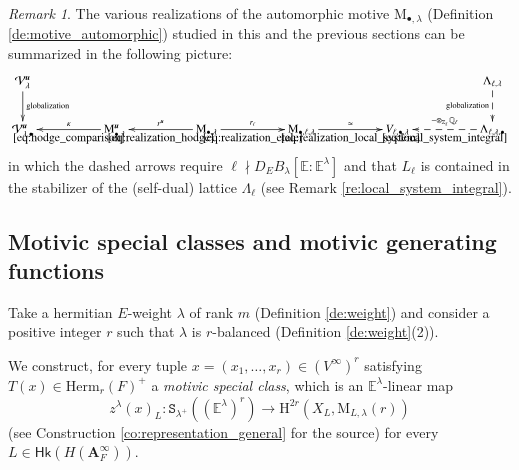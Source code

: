 \documentclass[12pt]{amsart}
\numberwithin{equation}{section}
\theoremstyle{plain}
\theoremstyle{definition}
\theoremstyle{remark}
\newtheorem{remark}[proposition]{Remark}
\renewcommand{\b}[1]{\mathbf{#1}}
\renewcommand{\c}[1]{\mathcal{#1}}
\renewcommand{\d}[1]{\mathbb{#1}}
\renewcommand{\r}[1]{\mathrm{#1}}
\renewcommand{\sf}[1]{\mathsf{#1}}
\renewcommand{\(}{\left(}
\renewcommand{\)}{\right)}
\newcommand{\bA}{\b A}
\newcommand{\cV}{\c V}
\newcommand{\dE}{\d E}
\newcommand{\dQ}{\d Q}
\newcommand{\dZ}{\d Z}
\newcommand{\rH}{\r H}
\newcommand{\rM}{\r M}
\newcommand{\tS}{\mathtt{S}}
\newcommand{\bbu}{\boldsymbol{u}}
\newcommand{\Herm}{\r{Herm}}
\newcommand{\Hk}{\sf{Hk}}
\begin{document}
\begin{remark}
The various realizations of the automorphic motive $\rM_{\bullet,\lambda}$ (Definition \ref{de:motive_automorphic}) studied in this and the previous sections can be summarized in the following picture:
\[
\xymatrix{
\cV_\lambda^{\bbu} \ar[d]^-{\text{globalization}} &&&&&&&&&&
\Lambda_{\ell,\lambda} \ar@{-->}[d]_-{\text{globalization}}\\
\cV_{\lambda,\bullet}^{\bbu} && \rM_{\bullet,\lambda}^{\bbu}\ar[ll]_-{\kappa}^-{\eqref{eq:hodge_comparison}} &&
\rM_{\bullet,\lambda} \ar[ll]_-{r^{\bbu}}^-{\eqref{eq:realization_hodge}} \ar[rr]^-{r_\ell}_-{\eqref{eq:realization_etale}} &&
\rM_{\bullet,\ell,\lambda} \ar[rr]^-\simeq_-{\eqref{eq:realization_local_system}}
&&  V_{\ell,\bullet,\lambda}
&&  \Lambda_{\ell,\lambda,\bullet} \ar@{-->}[ll]_-{-\otimes_{\dZ_\ell}\dQ_\ell}^-{\eqref{eq:local_system_integral}}
}
\]
in which the dashed arrows require $\ell\nmid D_EB_\lambda[\dE\colon\dE^\lambda]$ and that $L_\ell$ is contained in the stabilizer of the (self-dual) lattice $\Lambda_\ell$ (see Remark \ref{re:local_system_integral}).
\end{remark}



\subsection{Motivic special classes and motivic generating functions}
\label{ss:special_class}

Take a hermitian $E$-weight $\lambda$ of rank $m$ (Definition \ref{de:weight}) and consider a positive integer $r$ such that $\lambda$ is $r$-balanced (Definition \ref{de:weight}(2)).

We construct, for every tuple $x=(x_1,\dots,x_r)\in(V^\infty)^r$ satisfying $T(x)\in\Herm_r(F)^+$ a \emph{motivic special class}, which is an $\dE^\lambda$-linear map
\[
z^\lambda(x)_L\colon\tS_{\lambda^+}((\dE^\lambda)^r)\to \rH^{2r}(X_L,\rM_{L,\lambda}(r))
\]
(see Construction \ref{co:representation_general} for the source) for every $L\in\Hk(H(\bA_F^\infty))$.
\end{document}
